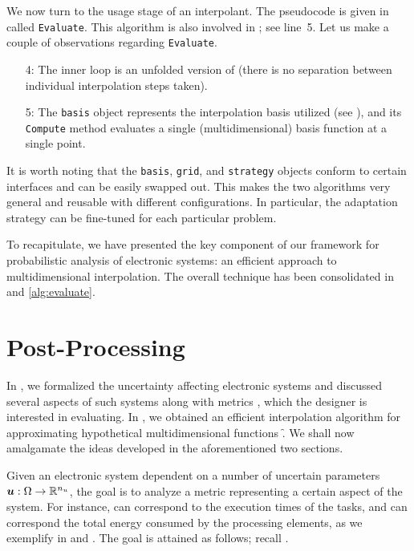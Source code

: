 We now turn to the usage stage of an interpolant. The pseudocode is given in
 called \texttt{Evaluate}. This algorithm is also involved in
; see line~5. Let us make a couple of observations regarding
\texttt{Evaluate}.

\begin{itemize}

\item[4:] The inner loop is an unfolded version of  (there
is no separation between individual interpolation steps taken).

\item[5:] The \texttt{basis} object represents the interpolation basis utilized
(see ), and its \texttt{Compute} method evaluates a single
(multidimensional) basis function at a single point.

\end{itemize}

It is worth noting that the \texttt{basis}, \texttt{grid}, and \texttt{strategy}
objects conform to certain interfaces and can be easily swapped out. This makes
the two algorithms very general and reusable with different configurations. In
particular, the adaptation strategy can be fine-tuned for each particular
problem.

To recapitulate, we have presented the key component of our framework for
probabilistic analysis of electronic systems: an efficient approach to
multidimensional interpolation. The overall technique has been consolidated in
 and \ref{alg:evaluate}.

\section{Post-Processing}

In , we formalized the uncertainty affecting electronic systems
and discussed several aspects of such systems along with metrics \g, which the
designer is interested in evaluating. In , we obtained an
efficient interpolation algorithm for approximating hypothetical
multidimensional functions \f. We shall now amalgamate the ideas developed in
the aforementioned two sections.

Given an electronic system dependent on a number of uncertain parameters $\boldsymbol{u}:
\Omega \to \mathbb{R}^{n_{u}}$, the goal is to analyze a metric \g representing a certain
aspect of the system. For instance, \vu can correspond to the execution times of
the tasks, and \g can correspond the total energy consumed by the processing
elements, as we exemplify in  and . The goal is attained
as follows; recall .

